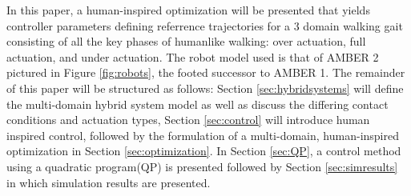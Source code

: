 In this paper, a human-inspired optimization will be presented that yields controller parameters defining referrence trajectories for a 3 domain walking gait consisting of all the key phases of humanlike walking: over actuation, full actuation, and under actuation. The robot model used is that of AMBER 2 pictured in Figure \ref{fig:robots}, the footed successor to AMBER 1. The remainder of this paper will be structured as follows: Section \ref{sec:hybridsystems} will define the multi-domain hybrid system model as well as discuss the differing contact conditions and actuation types, Section \ref{sec:control} will introduce human inspired control, followed by the formulation of a multi-domain, human-inspired optimization in Section \ref{sec:optimization}. In Section \ref{sec:QP}, a control method using a quadratic program(QP) is presented followed by Section \ref{sec:simresults} in which simulation results are presented.
